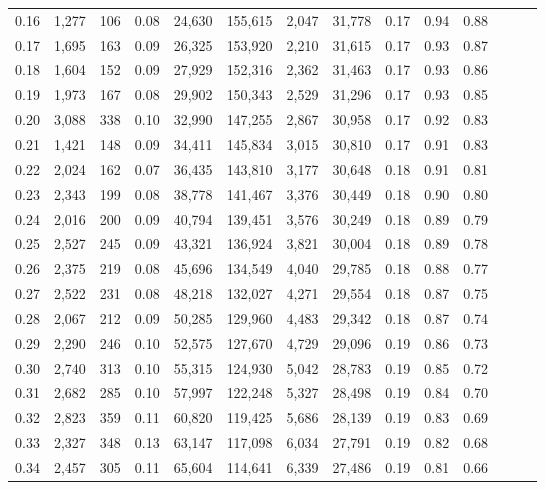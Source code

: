 \begin{tabular}{rrrrrrrrrrrrrr}
0.16 &  1,277 &  106 &  0.08 &   24,630 &  155,615 &   2,047 &  31,778 &  0.17 &  0.94 &      0.88 \\
0.17 &  1,695 &  163 &  0.09 &   26,325 &  153,920 &   2,210 &  31,615 &  0.17 &  0.93 &      0.87 \\
0.18 &  1,604 &  152 &  0.09 &   27,929 &  152,316 &   2,362 &  31,463 &  0.17 &  0.93 &      0.86 \\
0.19 &  1,973 &  167 &  0.08 &   29,902 &  150,343 &   2,529 &  31,296 &  0.17 &  0.93 &      0.85 \\
0.20 &  3,088 &  338 &  0.10 &   32,990 &  147,255 &   2,867 &  30,958 &  0.17 &  0.92 &      0.83 \\
0.21 &  1,421 &  148 &  0.09 &   34,411 &  145,834 &   3,015 &  30,810 &  0.17 &  0.91 &      0.83 \\
0.22 &  2,024 &  162 &  0.07 &   36,435 &  143,810 &   3,177 &  30,648 &  0.18 &  0.91 &      0.81 \\
0.23 &  2,343 &  199 &  0.08 &   38,778 &  141,467 &   3,376 &  30,449 &  0.18 &  0.90 &      0.80 \\
0.24 &  2,016 &  200 &  0.09 &   40,794 &  139,451 &   3,576 &  30,249 &  0.18 &  0.89 &      0.79 \\
0.25 &  2,527 &  245 &  0.09 &   43,321 &  136,924 &   3,821 &  30,004 &  0.18 &  0.89 &      0.78 \\
0.26 &  2,375 &  219 &  0.08 &   45,696 &  134,549 &   4,040 &  29,785 &  0.18 &  0.88 &      0.77 \\
0.27 &  2,522 &  231 &  0.08 &   48,218 &  132,027 &   4,271 &  29,554 &  0.18 &  0.87 &      0.75 \\
0.28 &  2,067 &  212 &  0.09 &   50,285 &  129,960 &   4,483 &  29,342 &  0.18 &  0.87 &      0.74 \\
0.29 &  2,290 &  246 &  0.10 &   52,575 &  127,670 &   4,729 &  29,096 &  0.19 &  0.86 &      0.73 \\
0.30 &  2,740 &  313 &  0.10 &   55,315 &  124,930 &   5,042 &  28,783 &  0.19 &  0.85 &      0.72 \\
0.31 &  2,682 &  285 &  0.10 &   57,997 &  122,248 &   5,327 &  28,498 &  0.19 &  0.84 &      0.70 \\
0.32 &  2,823 &  359 &  0.11 &   60,820 &  119,425 &   5,686 &  28,139 &  0.19 &  0.83 &      0.69 \\
0.33 &  2,327 &  348 &  0.13 &   63,147 &  117,098 &   6,034 &  27,791 &  0.19 &  0.82 &      0.68 \\
0.34 &  2,457 &  305 &  0.11 &   65,604 &  114,641 &   6,339 &  27,486 &  0.19 &  0.81 &      0.66 \\

\end{tabular}
